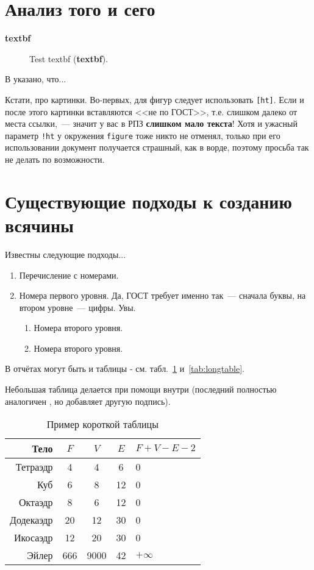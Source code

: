 \documentclass[utf8]{G7-32} %
\begin{document}
\section{Анализ того и сего}

\textbf{textbf}

\begin{figure}
\centering
\caption{Test textbf (\textbf{textbf}).}
\label{fig:dia}
\end{figure}


В \cite{Pup99} указано, что...

Кстати, про картинки. Во-первых, для фигур следует использовать \texttt{[ht]}. Если и после этого картинки вставляются <<не по ГОСТ>>, т.е. слишком далеко от места ссылки,~--- значит у вас в РПЗ \textbf{слишком мало текста}! Хотя и ужасный параметр \texttt{!ht} у окружения \texttt{figure} тоже никто не отменял, только при его использовании документ получается страшный, как в ворде, поэтому просьба так не делать по возможности.


\section{Существующие подходы к созданию всячины}

Известны следующие подходы...

\begin{enumerate}
\item Перечисление с номерами.
\item Номера первого уровня. Да, ГОСТ требует именно так~--- сначала буквы, на втором уровне~--- цифры. Увы.
\begin{enumerate} 
\item Номера второго уровня.
\item Номера второго уровня.
\end{enumerate}
\end{enumerate}

В отчётах могут быть и таблицы - см. табл.~\ref{tab:tabular} и~\ref{tab:longtable}.

Небольшая таблица делается при помощи  внутри  (последний
полностью аналогичен , но добавляет другую подпись).

\begin{table}[ht]
  \caption{Пример короткой таблицы}
  \begin{tabular}{|r|c|c|c|l|}
  \hline
  Тело      & $F$ & $V$  & $E$ & $F+V-E-2$ \\
  \hline                       
  Тетраэдр  & 4   & 4    & 6   & 0         \\ 
  Куб       & 6   & 8    & 12  & 0         \\ 
  Октаэдр   & 8   & 6    & 12  & 0         \\ 
  Додекаэдр & 20  & 12   & 30  & 0         \\ 
  Икосаэдр  & 12  & 20   & 30  & 0         \\ 
  \hline
  Эйлер     & 666 & 9000 & 42  & $+\infty$ \\
  \hline
  \end{tabular}      
  \label{tab:tabular}
\end{table}
\end{document}
